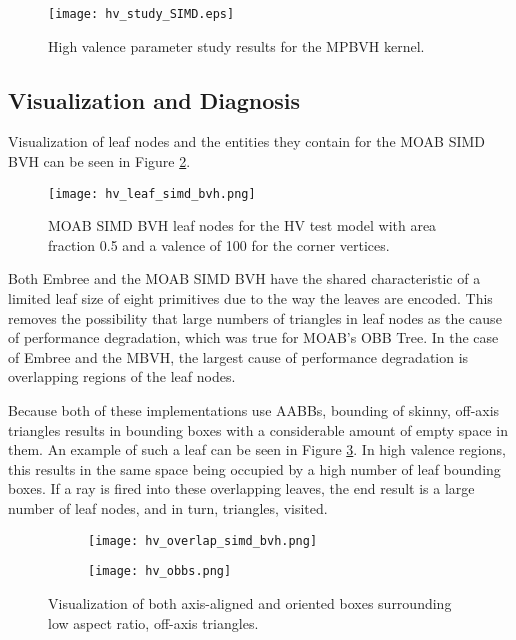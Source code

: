 \begin{figure}[H]
  \centering
    \texttt{[image: hv\_study\_SIMD.eps]}
    \caption{High valence parameter study results for the MPBVH kernel.}
    \label{fig:hv_study_simd}
\end{figure}

\subsection{Visualization and Diagnosis}

Visualization of leaf nodes and the entities they contain for the MOAB SIMD BVH
can be seen in Figure \ref{fig:hv_leaf_simd_bvh}.

\begin{figure}
  \centering
  \texttt{[image: hv\_leaf\_simd\_bvh.png]}
  \caption{MOAB SIMD BVH leaf nodes for the HV test model with area fraction
    0.5 and a valence of 100 for the corner vertices.}
  \label{fig:hv_leaf_simd_bvh}
\end{figure}
  
Both Embree and the MOAB SIMD BVH have the shared characteristic of a limited
leaf size of eight primitives due to the way the leaves are encoded. This
removes the possibility that large numbers of triangles in leaf nodes as the
cause of performance degradation, which was true for MOAB's OBB Tree. In the case
of Embree and the MBVH, the largest cause of performance degradation is
overlapping regions of the leaf nodes.

Because both of these implementations use AABBs, bounding of skinny, off-axis
triangles results in bounding boxes with a considerable amount of empty space in
them. An example of such a leaf can be seen in Figure
\ref{fig:hv_overlap_simd_bvh}. In high valence regions, this results in the same
space being occupied by a high number of leaf bounding boxes. If a ray is fired
into these overlapping leaves, the end result is a large number of leaf nodes,
and in turn, triangles, visited.

\begin{figure}
  \centering
  \begin{subfigure}{.5\textwidth}
    \centering
    \texttt{[image: hv\_overlap\_simd\_bvh.png]}
  \end{subfigure}%
  \begin{subfigure}{.5\textwidth}
    \centering
    \texttt{[image: hv\_obbs.png]}
  \end{subfigure}
  \caption{Visualization of both axis-aligned and oriented boxes surrounding low
    aspect ratio, off-axis triangles.}
  \label{fig:hv_overlap_simd_bvh}
\end{figure}


